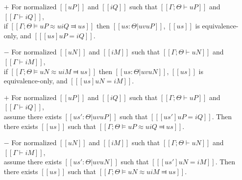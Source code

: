 \begin{lemma} \label{lemma:unification-soundness}
    \hfill
    \begin{itemize}
        \item [$+$] For normalized $[[uP]]$ and $[[iQ]]$ such that 
        $[[Γ ; Θ ⊢ uP]]$ and $[[Γ ⊢ iQ]]$,\\ 
        if $[[Γ ; Θ ⊨ uP ≈u iQ ⫤ us]]$ then $[[us : Θ | uv uP]]$, 
        $[[us]]$ is equivalence-only, and $[[ [us]uP = iQ ]]$.

        \item [$-$] For normalized $[[uN]]$ and $[[iM]]$ such that
        $[[Γ ; Θ ⊢ uN]]$ and $[[Γ ⊢ iM]]$,\\
        if $[[Γ ; Θ ⊨ uN ≈u iM ⫤ us]]$ then $[[us : Θ | uv uN]]$,
        $[[us]]$ is equivalence-only, and $[[ [us]uN = iM ]]$.
    \end{itemize}
\end{lemma}

\begin{lemma} \label{lemma:unification-completeness}
    \hfill
    \begin{itemize}
        \item [$+$] For normalized $[[uP]]$ and $[[iQ]]$ such that
        $[[Γ ; Θ ⊢ uP]]$ and $[[Γ ⊢ iQ]]$,\\ 
        assume there exists $[[us' : Θ | uv uP]]$ such that
        $[[ [us']uP = iQ ]]$. Then there exists $[[us]]$ such that
        $[[Γ ; Θ ⊨ uP ≈u iQ ⫤ us]]$.

        \item [$-$] For normalized $[[uN]]$ and $[[iM]]$ such that
        $[[Γ ; Θ ⊢ uN]]$ and $[[Γ ⊢ iM]]$,\\
        assume there exists $[[us' : Θ | uv uN]]$ such that
        $[[ [us']uN = iM ]]$. Then there exists $[[us]]$ such that
        $[[Γ ; Θ ⊨ uN ≈u iM ⫤ us]]$.
   \end{itemize}
\end{lemma}